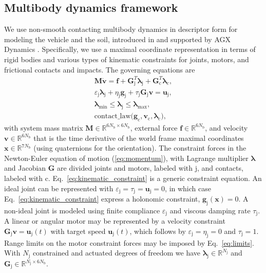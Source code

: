 \documentclass[10pt]{article}
\begin{document}
\subsection{Multibody dynamics framework}
\label{sec:MBD}
We use non-smooth contacting multibody dynamics in descriptor form for modeling the vehicle and the soil, introduced in \cite{Lacoursiere2007} and supported by AGX Dynamics \cite{AGX20}. 
Specifically, we use a maximal coordinate representation in terms of rigid bodies and various types of kinematic constraints for joints, motors, and frictional contacts and impacts. The governing equations are
\begin{align}
  \label{eq:momentum}
  \bm{M} \dot{\bm{v}}  = \bm{f} + \bm{G}_\mathrm{j}^T \bm{\lambda}_\mathrm{j} + \bm{G}_\mathrm{c}^T \bm{\lambda}_\mathrm{c},\\
  \label{eq:kinematic_constraint}
  \varepsilon_{\mathrm{j}} \bm{\lambda}_{\mathrm{j}} + 
        \eta_{\mathrm{j}} \bm{g}_{\mathrm{j}} + 
        \tau_{\mathrm{j}} \bm{G}_{\mathrm{j}} \bm{v} = \bm{u}_{\mathrm{j}}, \\   \label{eq:limits}
    \bm{\lambda}_\mathrm{min} \leq \bm{\lambda}_\mathrm{j} \leq \bm{\lambda}_\mathrm{max},\\
  \label{eq:contact_constraint}\mathrm{contact\_law(}\bm{g}_{\mathrm{c}},\bm{v}_{\mathrm{c}},\bm{\lambda}_{\mathrm{c}} \mathrm{)},
\end{align}
with system mass matrix $\bm{M} \in \mathbb{R}^{6N_\mathrm{b}\times6N_\mathrm{b}}$, external force $\bm{f}\in\mathbb{R}^{6N_\mathrm{b}}$, and velocity $\bm{v}\in\mathbb{R}^{6N_\mathrm{b}}$ that is the time derivative of the world frame maximal coordinates $\bm{x}\in\mathbb{R}^{7N_\mathrm{b}}$ (using quaternions for the orientation). The constraint forces in the Newton-Euler equation of motion (\ref{eq:momentum}), with Lagrange multiplier $\bm{\lambda}$ and Jacobian $\bm{G}$ are divided
joints and motors, labeled with $\mathrm{j}$, and contacts, labeled with $\mathrm{c}$.
Eq.~\eqref{eq:kinematic_constraint} is a generic constraint equation.  An ideal joint can be represented with $\varepsilon_{\mathrm{j}} = \tau_{\mathrm{j}} = \bm{u}_{\mathrm{j}} = 0$, in which case Eq.~\eqref{eq:kinematic_constraint} express a holonomic constraint, $\bm{g}_{\mathrm{j}}(\bm{x}) = 0$.  
A non-ideal joint is modeled using finite compliance $\varepsilon_{\mathrm{j}}$ and viscous damping rate $ \tau_{\mathrm{j}}$.
A linear or angular motor may be represented by a velocity constraint $ \bm{G}_{\mathrm{j}} \bm{v} = \bm{u}_{\mathrm{j}}(t)$ with target speed $\bm{u}_{\mathrm{j}}(t)$, which follows by  $\varepsilon_{\mathrm{j}} = \eta_{\mathrm{j}} = 0$ and $ \tau_{\mathrm{j}} = 1$. Range limits on the motor constraint forces may be imposed by Eq.~\eqref{eq:limits}.
With $N_\mathrm{j}$ constrained and actuated degrees of freedom we have $\bm{\lambda}_{\mathrm{j}}\in\mathbb{R}^{N_\mathrm{j}}$ and $\bm{G}_\mathrm{j}\in\mathbb{R}^{N_\mathrm{j}\times6N_\mathrm{b}}$.
\end{document}
